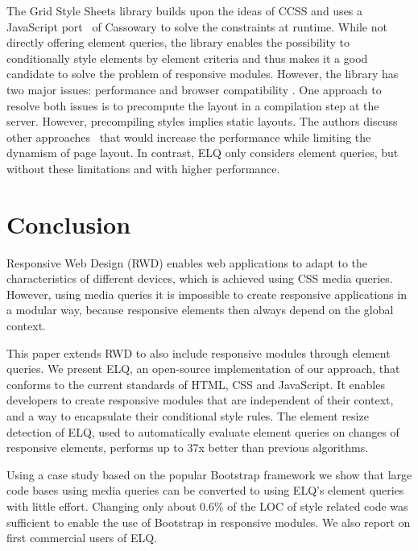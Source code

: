 \documentclass{acm_proc_article-sp}
\newcommand{\elq}{ELQ}
\newcommand{\gls}[1]{#1}
\begin{document}
  The Grid Style Sheets library \cite{eq_imp_gss} builds upon the ideas of \gls{CCSS} and uses a \gls{JavaScript} port~\cite{cassowary_js} of Cassowary to solve the constraints at runtime.
  While not directly offering element queries, the library enables the possibility to conditionally style elements by \gls{element} criteria and thus makes it a good candidate to solve the problem of \gls{responsive} modules.
  However, the library has two major issues: performance and browser compatibility \cite{gss_issue}.
  One approach to resolve both issues is to precompute the layout in a compilation step at the server.
  However, precompiling styles implies static layouts.
  The authors discuss other approaches~\cite{gss_issue} that would increase the performance while limiting the dynamism of page layout.
  In contrast, \elq{} only considers element queries, but without these limitations and with higher performance.

\section{Conclusion}\label{sec:conclusion}

  Responsive Web Design (RWD) enables web applications to adapt to the characteristics of different devices, which is achieved using CSS media queries.
  However, using media queries it is impossible to create responsive applications in a modular way, because responsive elements then always depend on the global context.

  This paper extends RWD to also include responsive modules through element queries.
  We present \elq{}, an open-source implementation of our approach, that conforms to the current standards of HTML, CSS and JavaScript.
  It enables developers to create responsive modules that are independent of their context, and a way to encapsulate their conditional style rules.
  The element resize detection of \elq{}, used to automatically evaluate element queries on changes of responsive elements, performs up to 37x better than previous algorithms.

  Using a case study based on the popular Bootstrap framework we show that large code bases using media queries can be converted to using \elq{}'s element queries with little effort.
  Changing only about 0.6\% of the LOC of style related code was sufficient to enable the use of Bootstrap in responsive modules.
  We also report on first commercial users of \elq{}.
  
\end{document}
